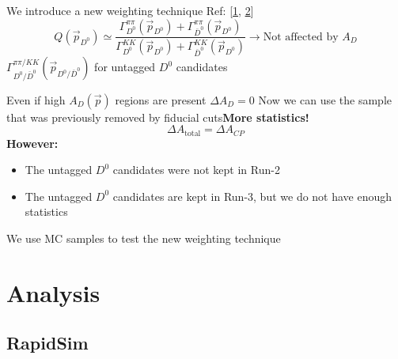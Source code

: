 \documentclass{beamer}
\begin{document}
\begin{frame}
      \frametitle{\insertsubsectionhead}
      \rightarrow We introduce a new weighting technique Ref: [\href{https://indico.cern.ch/event/780618/\#-update-of-delta-a_cp-to-the}{1}, \href{https://groups.cern.ch/group/lhcb-phys-charm/Lists/Archive/Flat.aspx?RootFolder=/group/lhcb-phys-charm/Lists/Archive/Some\%20thoughts\%20on\%20DeltaACP&FolderCTID=0x012002009FBA6738F0FB684B8D8EB7AE0A048769}{2}]
      \begin{equation*}
            Q(\vec{p}_{D^0}) \simeq \frac{\Gamma_{D^0}^{\pi\pi}(\vec{p}_{D^0}) + \Gamma_{\bar{D}^0}^{\pi\pi}(\vec{p}_{D^0})}{\Gamma_{D^0}^{KK}(\vec{p}_{D^0}) + \Gamma_{\bar{D}^0}^{KK}(\vec{p}_{D^0})}\to \text{Not affected by }A_D
      \end{equation*}
      \rightarrow $\Gamma_{D^0/\bar{D}^0}^{\pi\pi/ KK}(\vec{p}_{D^0/\bar{D}^0})$ for untagged $D^0$ candidates

      \rightarrow Even if high $A_D(\vec{p})$ regions are present $\Delta A_D = 0$
      \bigbreak
      \rightarrow Now we can use the sample that was previously removed by fiducial cuts\Rightarrow \textbf{More statistics!}
      \begin{equation*}
            \boxed{\Delta A_\text{total} = \Delta A_{CP}}
      \end{equation*}
      {\bf However:}
      \begin{itemize}
            \item The untagged $D^0$ candidates were not kept in Run-2
            \item The untagged $D^0$ candidates are kept in Run-3, but we do not have enough statistics
      \end{itemize}
      \rightarrow We use MC samples to test the new weighting technique
\end{frame}

\section{Analysis}
\subsection{RapidSim}
\end{document}
